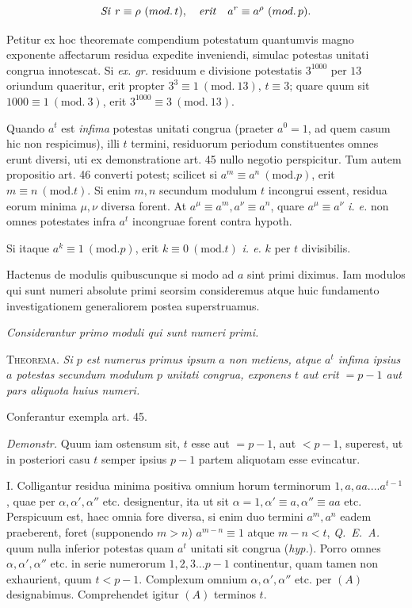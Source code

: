 \[\text{\emph{Si }}r\equiv\rho\ (mod.\,t),\quad\text{\emph{erit}}\quad a^r\equiv a^\rho\ (mod.\,p).\]


Petitur ex hoc theoremate compendium potestatum quantumvis magno exponente affectarum residua expedite inveniendi, simulac potestas unitati congrua innotescat. Si \emph{ex. gr.} residuum e divisione potestatis $3^{1000}$ per $13$ oriundum quaeritur, erit propter $3^3\equiv1\ (\mathrm{mod.}\ 13)$, $t\equiv3$; quare quum sit $1000\equiv1\ (\mathrm{mod.}\ 3)$, erit $3^{1000}\equiv3\ (\mathrm{mod.}\ 13)$.


Quando $a^t$ est \emph{infima} potestas unitati congrua (praeter $a^0=1$, ad quem casum hic non respicimus), illi $t$ termini, residuorum periodum constituentes omnes erunt diversi, uti ex demonstratione art. 45 nullo negotio perspicitur. Tum autem propositio art. 46 converti potest; scilicet si $a^m\equiv a^n\ (\mathrm{mod.}p)$, erit $m\equiv n\ (\mathrm{mod.}t)$. Si enim $m,n$ secundum modulum $t$ incongrui essent, residua eorum minima $\mu,\nu$ diversa forent. At $a^\mu\equiv a^m,a^\nu\equiv a^n$, quare $a^\mu\equiv a^\nu$ \emph{i. e.} non omnes potestates infra $a^t$ incongruae forent contra hypoth.

Si itaque $a^k\equiv1\ (\mathrm{mod.}p)$, erit $k\equiv0\ (\mathrm{mod.}t)$ \emph{i. e.} $k$ per $t$ divisibilis.

Hactenus de modulis quibuscunque si modo ad $a$ sint primi diximus. Iam modulos qui sunt numeri absolute primi seorsim consideremus atque huic fundamento investigationem generaliorem postea superstruamus.

\begin{center}\small\emph{Considerantur primo moduli qui sunt numeri primi.}\end{center}


\textsc{Theorema.} \emph{Si $p$ est numerus primus ipsum $a$ non metiens, atque $a^t$ infima ipsius $a$ potestas secundum modulum $p$ unitati congrua, exponens $t$ aut erit $=p-1$ aut pars aliquota huius numeri.}

Conferantur exempla art. 45.

\emph{Demonstr.} Quum iam ostensum sit, $t$ esse aut $=p-1$, aut $<p-1$, superest, ut in posteriori casu $t$ semper ipsius $p-1$ partem aliquotam esse evincatur.

I. Colligantur residua minima positiva omnium horum terminorum $1,a,aa....a^{t-1}$, quae per $\alpha,\alpha',\alpha''$ etc. designentur, ita ut sit $\alpha=1,\alpha'\equiv a,\alpha''\equiv aa$ etc. Perspicuum est, haec omnia fore diversa, si enim duo termini $a^m,a^n$ eadem praeberent, foret (supponendo $m>n$) $a^{m-n}\equiv1$ atque $m-n<t$, \mbox{\emph{Q. E. A.}} quum nulla inferior potestas quam $a^t$ unitati sit congrua (\emph{hyp.}). Porro omnes $\alpha,\alpha',\alpha''$ etc. in serie numerorum $1,2,3...p-1$ continentur, quam tamen non exhaurient, quum $t<p-1$. Complexum omnium $\alpha,\alpha',\alpha''$ etc. per $(A)$ designabimus. Comprehendet igitur $(A)$ terminos $t$.

